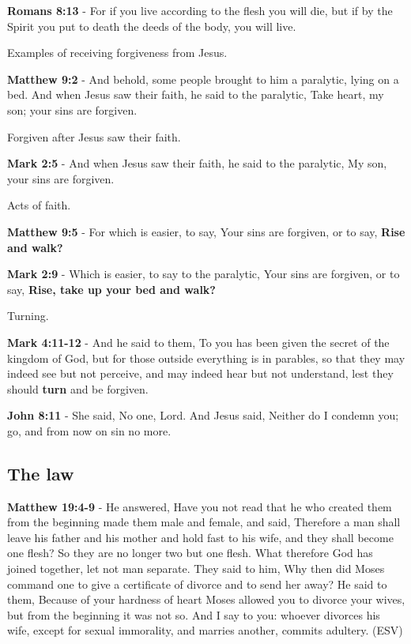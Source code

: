 \documentclass[11pt]{article}
\begin{document}
\textbf{Romans 8:13} - For if you live according to the flesh you will die, but if by the Spirit you put to death the deeds of the body, you will live.

Examples of receiving forgiveness from Jesus.

\textbf{Matthew 9:2} - And behold, some people brought to him a paralytic, lying on a bed. And when Jesus saw their faith, he said to the paralytic, Take heart, my son; your sins are forgiven.

Forgiven after Jesus saw their faith.

\textbf{Mark 2:5} - And when Jesus saw their faith, he said to the paralytic, My son, your sins are forgiven.

Acts of faith.

\textbf{Matthew 9:5} - For which is easier, to say, Your sins are forgiven, or to say, \textbf{Rise and walk?}

\textbf{Mark 2:9} - Which is easier, to say to the paralytic, Your sins are forgiven, or to say, \textbf{Rise, take up your bed and walk?}

Turning.

\textbf{Mark 4:11-12} - And he said to them, To you has been given the secret of the kingdom of God, but for those outside everything is in parables, so that they may indeed see but not perceive, and may indeed hear but not understand, lest they should \textbf{turn} and be forgiven.

\textbf{John 8:11} - She said, No one, Lord. And Jesus said, Neither do I condemn you; go, and from now on sin no more.

\subsection{The law}
\label{sec:org0d21be2}

\textbf{Matthew 19:4-9} - He answered, Have you not read that he who created them from the beginning made them male and female, and said, Therefore a man shall leave his father and his mother and hold fast to his wife, and they shall become one flesh? So they are no longer two but one flesh. What therefore God has joined together, let not man separate. They said to him, Why then did Moses command one to give a certificate of divorce and to send her away? He said to them, Because of your hardness of heart Moses allowed you to divorce your wives, but from the beginning it was not so. And I say to you: whoever divorces his wife, except for sexual immorality, and marries another, commits adultery. (ESV)
\end{document}
